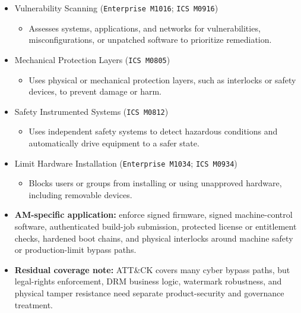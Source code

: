 \documentclass[10pt,a4paper,oneside]{report}
\begin{document}
\begin{itemize}
\begin{itemize}
\begin{itemize}
\item Applies vendor patches and upgrades to reduce exploitation of known software or firmware vulnerabilities.
\end{itemize}
\item Vulnerability Scanning (\texttt{Enterprise M1016}; \texttt{ICS M0916})
\begin{itemize}
\item Assesses systems, applications, and networks for vulnerabilities, misconfigurations, or unpatched software to prioritize remediation.
\end{itemize}
\item Mechanical Protection Layers (\texttt{ICS M0805})
\begin{itemize}
\item Uses physical or mechanical protection layers, such as interlocks or safety devices, to prevent damage or harm.
\end{itemize}
\item Safety Instrumented Systems (\texttt{ICS M0812})
\begin{itemize}
\item Uses independent safety systems to detect hazardous conditions and automatically drive equipment to a safer state.
\end{itemize}
\item Limit Hardware Installation (\texttt{Enterprise M1034}; \texttt{ICS M0934})
\begin{itemize}
\item Blocks users or groups from installing or using unapproved hardware, including removable devices.
\end{itemize}
\end{itemize}
\end{itemize}

\begin{itemize}
\item \textbf{AM-specific application:} enforce signed firmware, signed machine-control software, authenticated build-job submission, protected license or entitlement checks, hardened boot chains, and physical interlocks around machine safety or production-limit bypass paths.
\end{itemize}

\begin{itemize}
\item \textbf{Residual coverage note:} ATT\&CK covers many cyber bypass paths, but legal-rights enforcement, DRM business logic, watermark robustness, and physical tamper resistance need separate product-security and governance treatment.
\end{itemize}
\end{document}
